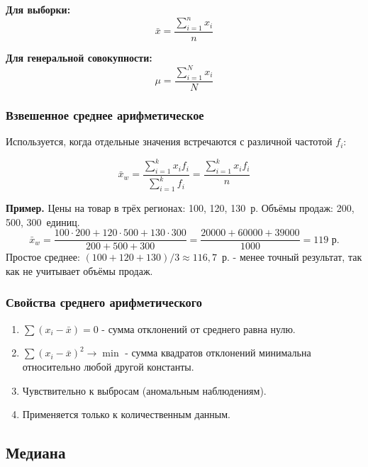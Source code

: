 \documentclass[a4paper]{article}
\begin{document}
\noindent\textbf{Для выборки:}
\begin{equation}
	\bar{x} = \frac{\displaystyle\sum_{i=1}^{n} x_i}{n}
\end{equation}

\noindent\textbf{Для генеральной совокупности:}
\begin{equation}
	\mu = \frac{\displaystyle\sum_{i=1}^{N} x_i}{N}
\end{equation}

\subsubsection{Взвешенное среднее арифметическое}

Используется, когда отдельные значения встречаются с различной частотой $f_i$:

\begin{equation}
	\bar{x}_w = \frac{\displaystyle\sum_{i=1}^{k} x_i f_i}{\displaystyle\sum_{i=1}^{k} f_i}
	= \frac{\displaystyle\sum_{i=1}^{k} x_i f_i}{n}
\end{equation}


	\textbf{Пример.} Цены на товар в трёх регионах: 100, 120, 130~р.
	Объёмы продаж: 200, 500, 300~единиц.
	\[
	\bar{x}_w = \frac{100\cdot200 + 120\cdot500 + 130\cdot300}{200+500+300}
	= \frac{20000+60000+39000}{1000} = 119 \text{ р.}
	\]
	Простое среднее: $(100+120+130)/3 \approx 116{,}7$~р. - менее точный результат,
	так как не учитывает объёмы продаж.


\subsubsection{Свойства среднего арифметического}

\begin{enumerate}[noitemsep]
	\item $\sum (x_i - \bar{x}) = 0$ - сумма отклонений от среднего равна нулю.
	\item $\sum (x_i - \bar{x})^2 \to \min$ - сумма квадратов отклонений
	минимальна относительно любой другой константы.
	\item Чувствительно к выбросам (аномальным наблюдениям).
	\item Применяется только к количественным данным.
\end{enumerate}

\subsection{Медиана}
\end{document}
